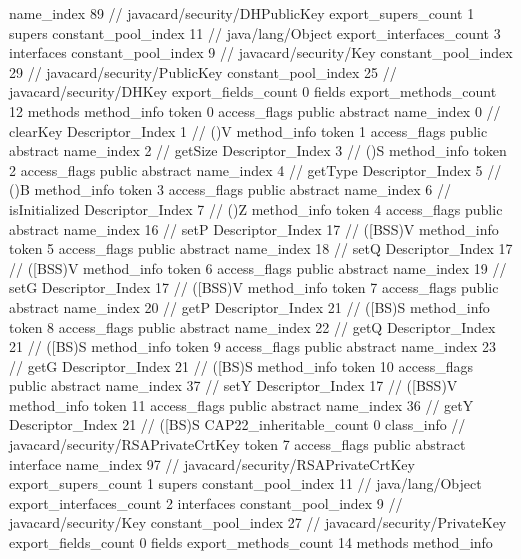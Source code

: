 {{{			name_index	89		// javacard/security/DHPublicKey
			export_supers_count	1
			supers {
				constant_pool_index	11		// java/lang/Object
			}
			export_interfaces_count	3
			interfaces {
				constant_pool_index	9		// javacard/security/Key
				constant_pool_index	29		// javacard/security/PublicKey
				constant_pool_index	25		// javacard/security/DHKey
			}
			export_fields_count	0
			fields {
			}
			export_methods_count	12
			methods {
				method_info {
					token	0
					access_flags	public abstract
					name_index	0		// clearKey
					Descriptor_Index	1		// ()V
				}
				method_info {
					token	1
					access_flags	public abstract
					name_index	2		// getSize
					Descriptor_Index	3		// ()S
				}
				method_info {
					token	2
					access_flags	public abstract
					name_index	4		// getType
					Descriptor_Index	5		// ()B
				}
				method_info {
					token	3
					access_flags	public abstract
					name_index	6		// isInitialized
					Descriptor_Index	7		// ()Z
				}
				method_info {
					token	4
					access_flags	public abstract
					name_index	16		// setP
					Descriptor_Index	17		// ([BSS)V
				}
				method_info {
					token	5
					access_flags	public abstract
					name_index	18		// setQ
					Descriptor_Index	17		// ([BSS)V
				}
				method_info {
					token	6
					access_flags	public abstract
					name_index	19		// setG
					Descriptor_Index	17		// ([BSS)V
				}
				method_info {
					token	7
					access_flags	public abstract
					name_index	20		// getP
					Descriptor_Index	21		// ([BS)S
				}
				method_info {
					token	8
					access_flags	public abstract
					name_index	22		// getQ
					Descriptor_Index	21		// ([BS)S
				}
				method_info {
					token	9
					access_flags	public abstract
					name_index	23		// getG
					Descriptor_Index	21		// ([BS)S
				}
				method_info {
					token	10
					access_flags	public abstract
					name_index	37		// setY
					Descriptor_Index	17		// ([BSS)V
				}
				method_info {
					token	11
					access_flags	public abstract
					name_index	36		// getY
					Descriptor_Index	21		// ([BS)S
				}
			}
			CAP22_inheritable_count	0
		}
		class_info {		// javacard/security/RSAPrivateCrtKey
			token	7
			access_flags	public abstract interface
			name_index	97		// javacard/security/RSAPrivateCrtKey
			export_supers_count	1
			supers {
				constant_pool_index	11		// java/lang/Object
			}
			export_interfaces_count	2
			interfaces {
				constant_pool_index	9		// javacard/security/Key
				constant_pool_index	27		// javacard/security/PrivateKey
			}
			export_fields_count	0
			fields {
			}
			export_methods_count	14
			methods {
				method_info {
}}}}}

